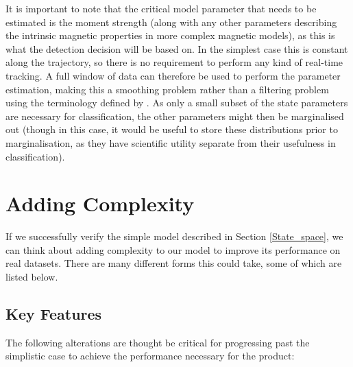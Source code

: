 \documentclass[10pt, a4paper, twocolumn]{article} %
\begin{document}
It is important to note that the critical model parameter that needs to be estimated is the moment strength (along with any other parameters describing the intrinsic magnetic properties in more complex magnetic models), as this is what the detection decision will be based on. In the simplest case this is constant along the trajectory, so there is no requirement to perform any kind of real-time tracking. A full window of data can therefore be used to perform the parameter estimation, making this a smoothing problem rather than a filtering problem using the terminology defined by \parencite{Briers2009}. As only a small subset of the state parameters are necessary for classification, the other parameters might then be marginalised out (though in this case, it would be useful to store these distributions prior to marginalisation, as they have scientific utility separate from their usefulness in classification).

\section{Adding Complexity}

If we successfully verify the simple model described in Section \ref{State_space}, we can think about adding complexity to our model to improve its performance on real datasets. There are many different forms this could take, some of which are listed below.

\subsection{Key Features}

The following alterations are thought be critical for progressing past the simplistic case to achieve the performance necessary for the product:
\end{document}
